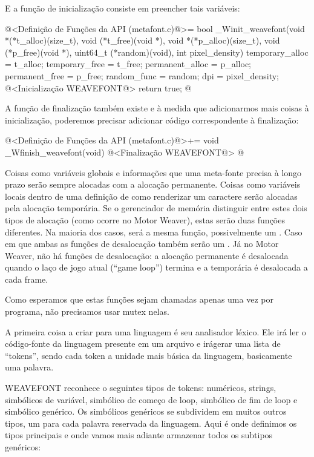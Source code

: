 E a função de inicialização consiste em preencher tais variáveis:

\iniciocodigo
@<Definição de Funções da API (metafont.c)@>=
bool _Winit_weavefont(void *(*t_alloc)(size_t),
                     void (*t_free)(void *),
                     void *(*p_alloc)(size_t),
                     void (*p_free)(void *),
                     uint64_t (*random)(void), int pixel_density){
  temporary_alloc = t_alloc;
  temporary_free = t_free;
  permanent_alloc = p_alloc;
  permanent_free = p_free;
  random_func = random;
  dpi = pixel_density;
  @<Inicialização WEAVEFONT@>
  return true;
}
@
\fimcodigo

A função de finalização também existe e à medida que adicionarmos mais
coisas à inicialização, poderemos precisar adicionar código
correspondente à finalização:

\iniciocodigo
@<Definição de Funções da API (metafont.c)@>+=
void _Wfinish_weavefont(void){
  @<Finalização WEAVEFONT@>
}
@
\fimcodigo

Coisas como variáveis globais e informações que uma meta-fonte precisa
à longo prazo serão sempre alocadas com a alocação permanente. Coisas
como variáveis locais dentro de uma definição de como renderizar um
caractere serão alocadas pela alocação temporária. Se o gerenciador de
memória distinguir entre estes dois tipos de alocação (como ocorre no
Motor Weaver), estas serão duas funções diferentes. Na maioria dos
casos, será a mesma função, possivelmente um . Caso
em que ambas as funções de desalocação também serão
um . Já no Motor Weaver, não há funções de
desalocação: a alocação permanente é desalocada quando o laço de jogo
atual (``game loop'') termina e a temporária é desalocada a cada frame.

Como esperamos que estas funções sejam chamadas apenas uma vez por
programa, não precisamos usar mutex nelas.



A primeira coisa a criar para uma linguagem é seu analisador
léxico. Ele irá ler o código-fonte da linguagem presente em um arquivo
e irágerar uma lista de ``tokens'', sendo cada token a unidade mais
básica da linguagem, basicamente uma palavra.

WEAVEFONT reconhece o seguintes tipos de tokens: numéricos, strings,
simbólicos de variável, simbólico de começo de loop, simbólico de fim
de loop e simbólico genérico. Os simbólicos genéricos se subdividem em
muitos outros tipos, um para cada palavra reservada da linguagem. Aqui
é onde definimos os tipos principais e onde vamos mais adiante
armazenar todos os subtipos genéricos:

